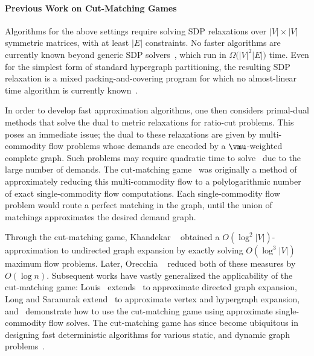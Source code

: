 \documentclass[letterpaper]{article}
\begin{document}
\paragraph{Previous Work on Cut-Matching Games}
Algorithms for the above settings require solving SDP relaxations over $\lvert V \rvert \times \lvert V \rvert$ symmetric matrices, with at least $\lvert E \rvert$ constraints. No faster algorithms are currently known beyond generic SDP solvers~\cite{jiangFasterInteriorPoint2020}, which run in $\Omega\big( \lvert V \rvert^2 \lvert E \rvert \big)$ time. Even for the simplest form of standard hypergraph partitioning, the resulting SDP relaxation is a mixed packing-and-covering program for which no almost-linear time algorithm is currently known~\cite{jambulapatiPositiveSemidefiniteProgramming2021}.

In order to develop fast approximation algorithms, one then considers primal-dual methods that solve the dual to metric relaxations for ratio-cut problems. This poses an immediate issue; the dual to these relaxations are given by multi-commodity flow problems whose demands are encoded by a $\vmu$-weighted complete graph. Such problems may require quadratic time to solve~\cite{aroraSqrtLognApproximation2010} due to the large number of demands. The cut-matching game~\cite{khandekarGraphPartitioningUsing2009} was originally a method of approximately reducing this multi-commodity flow to a polylogarithmic number of exact single-commodity flow computations. Each single-commodity flow problem would route a perfect matching in the graph, until the union of matchings approximates the desired demand graph.

Through the cut-matching game, Khandekar \etal~\cite{khandekarGraphPartitioningUsing2009} obtained a $O(\log^2 |V|)$-approximation to undirected graph expansion by exactly solving $O(\log^3 |V|)$ maximum flow problems. Later, Orecchia \etal~\cite{orecchiaPartitioningGraphsSingle2008} reduced both of these measures by $O(\log n)$. Subsequent works have vastly generalized the applicability of the cut-matching game: Louis~\cite{louis2010cut} extends~\cite{khandekarGraphPartitioningUsing2009} to approximate directed graph expansion, Long and Saranurak extend~\cite{khandekar2007cut} to approximate vertex and hypergraph expansion, and~\cite{nanongkai2017dynamic} demonstrate how to use the cut-matching game using approximate single-commodity flow solves. The cut-matching game has since become ubiquitous in designing fast deterministic algorithms for various static, and dynamic graph problems~\cite{bernstein2022deterministic, chuzhoyDistancedMatchingGame2023, chuzhoy2020deterministic, chuzhoyNewAlgorithmDecremental2019}.
\end{document}
